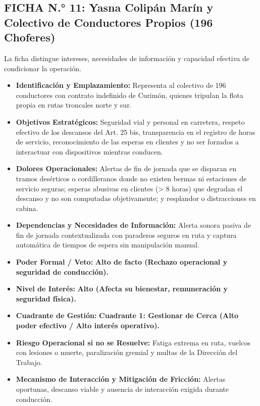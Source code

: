 \subsection*{FICHA N.° 11: Yasna Colipán Marín y Colectivo de Conductores Propios (196 Choferes)}
La ficha distingue intereses, necesidades de información y capacidad efectiva de condicionar la operación.
\begin{itemize}
\item \textbf{Identificación y Emplazamiento:} Representa al colectivo de 196 conductores con contrato indefinido de Curimón, quienes tripulan la flota propia en rutas troncales norte y sur.
\item \textbf{Objetivos Estratégicos:} Seguridad vial y personal en carretera, respeto efectivo de los descansos del Art. 25 bis, transparencia en el registro de horas de servicio, reconocimiento de las esperas en clientes y no ser forzados a interactuar con dispositivos mientras conducen.
\item \textbf{Dolores Operacionales:} Alertas de fin de jornada que se disparan en tramos desérticos o cordilleranos donde no existen bermas ni estaciones de servicio seguras; esperas abusivas en clientes (> 8 horas) que degradan el descanso y no son computadas objetivamente; y resplandor o distracciones en cabina.
\item \textbf{Dependencias y Necesidades de Información:} Alerta sonora pasiva de fin de jornada contextualizada con paraderos seguros en ruta y captura automática de tiempos de espera sin manipulación manual.
\item \textbf{Poder Formal / Veto:} \textbf{Alto de facto (Rechazo operacional y seguridad de conducción).}
\item \textbf{Nivel de Interés:} \textbf{Alto (Afecta su bienestar, remuneración y seguridad física).}
\item \textbf{Cuadrante de Gestión:} \textbf{Cuadrante 1: Gestionar de Cerca (Alto poder efectivo / Alto interés operativo).}
\item \textbf{Riesgo Operacional si no se Resuelve:} Fatiga extrema en ruta, vuelcos con lesiones o muerte, paralización gremial y multas de la Dirección del Trabajo.
\item \textbf{Mecanismo de Interacción y Mitigación de Fricción:} Alertas oportunas, descanso viable y ausencia de interacción exigida durante conducción.
\end{itemize}
